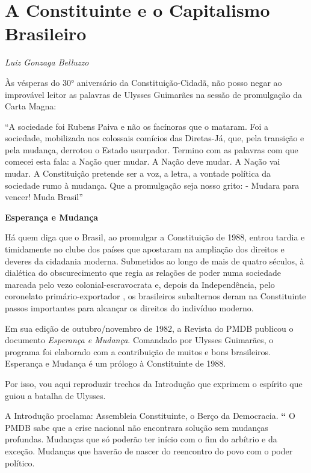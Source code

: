 \chapter{A Constituinte e o Capitalismo Brasileiro}

\begin{flushright}
\emph{Luiz Gonzaga Belluzzo}
\end{flushright}

Às vésperas do 30° aniversário da Constituição-Cidadã, não posso negar
ao improvável leitor as palavras de Ulysses Guimarães na sessão de
promulgação da Carta Magna:

``A sociedade foi Rubens Paiva e não os facínoras que o mataram. Foi a
sociedade, mobilizada nos colossais comícios das Diretas-Já, que, pela
transição e pela mudança, derrotou o Estado usurpador. Termino com as
palavras com que comecei esta fala: a Nação quer mudar. A Nação deve
mudar. A Nação vai mudar. A Constituição pretende ser a voz, a letra, a
vontade política da sociedade rumo à mudança. Que a promulgação seja
nosso grito: - Mudara para vencer! Muda Brasil''

\textbf{Esperança e Mudança}

Há quem diga que o Brasil, ao promulgar a Constituição de 1988, entrou
tardia e timidamente no clube dos países que apostaram na ampliação dos
direitos e deveres da cidadania moderna. Submetidos ao longo de mais de
quatro séculos, à dialética do obscurecimento que regia as relações de
poder numa sociedade marcada pelo vezo colonial-escravocrata e, depois
da Independência, pelo coronelato primário-exportador , os brasileiros
subalternos deram na Constituinte passos importantes para alcançar os
direitos do indivíduo moderno.

Em sua edição de outubro/novembro de 1982, a Revista do PMDB publicou o
documento \emph{Esperança e Mudança}. Comandado por Ulysses Guimarães, o
programa foi elaborado com a contribuição de muitos e bons brasileiros.
Esperança e Mudança é um prólogo à Constituinte de 1988.

Por isso, vou aqui reproduzir trechos da Introdução que exprimem o
espírito que guiou a batalha de Ulysses.

A Introdução proclama: Assembleia Constituinte, o Berço da Democracia.
\textbf{``} O PMDB sabe que a crise nacional não encontrara solução sem
mudanças profundas. Mudanças que só poderão ter início com o fim do
arbítrio e da exceção. Mudanças que haverão de nascer do reencontro do
povo com o poder político.

